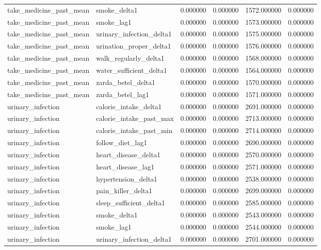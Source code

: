 \begin{longtable}{llrrrr}
take\_medicine\_past\_mean & smoke\_delta1 & 0.000000 & 0.000000 & 1572.000000 & 0.000000 \\
take\_medicine\_past\_mean & smoke\_lag1 & 0.000000 & 0.000000 & 1573.000000 & 0.000000 \\
take\_medicine\_past\_mean & urinary\_infection\_delta1 & 0.000000 & 0.000000 & 1575.000000 & 0.000000 \\
take\_medicine\_past\_mean & urination\_proper\_delta1 & 0.000000 & 0.000000 & 1576.000000 & 0.000000 \\
take\_medicine\_past\_mean & walk\_regularly\_delta1 & 0.000000 & 0.000000 & 1568.000000 & 0.000000 \\
take\_medicine\_past\_mean & water\_sufficient\_delta1 & 0.000000 & 0.000000 & 1564.000000 & 0.000000 \\
take\_medicine\_past\_mean & zarda\_betel\_delta1 & 0.000000 & 0.000000 & 1570.000000 & 0.000000 \\
take\_medicine\_past\_mean & zarda\_betel\_lag1 & 0.000000 & 0.000000 & 1571.000000 & 0.000000 \\
urinary\_infection & calorie\_intake\_delta1 & 0.000000 & 0.000000 & 2691.000000 & 0.000000 \\
urinary\_infection & calorie\_intake\_past\_max & 0.000000 & 0.000000 & 2713.000000 & 0.000000 \\
urinary\_infection & calorie\_intake\_past\_min & 0.000000 & 0.000000 & 2714.000000 & 0.000000 \\
urinary\_infection & follow\_diet\_lag1 & 0.000000 & 0.000000 & 2690.000000 & 0.000000 \\
urinary\_infection & heart\_disease\_delta1 & 0.000000 & 0.000000 & 2570.000000 & 0.000000 \\
urinary\_infection & heart\_disease\_lag1 & 0.000000 & 0.000000 & 2571.000000 & 0.000000 \\
urinary\_infection & hypertension\_delta1 & 0.000000 & 0.000000 & 2538.000000 & 0.000000 \\
urinary\_infection & pain\_killer\_delta1 & 0.000000 & 0.000000 & 2699.000000 & 0.000000 \\
urinary\_infection & sleep\_sufficient\_delta1 & 0.000000 & 0.000000 & 2585.000000 & 0.000000 \\
urinary\_infection & smoke\_delta1 & 0.000000 & 0.000000 & 2543.000000 & 0.000000 \\
urinary\_infection & smoke\_lag1 & 0.000000 & 0.000000 & 2544.000000 & 0.000000 \\
urinary\_infection & urinary\_infection\_delta1 & 0.000000 & 0.000000 & 2701.000000 & 0.000000 \\

\end{longtable}
